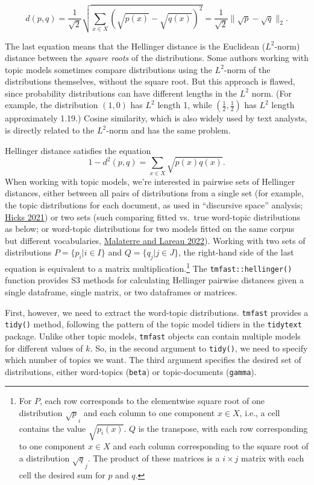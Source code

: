\documentclass[
]{article}
\begin{document}
\[ d(p,q) = \frac{1}{\sqrt{2}} \sqrt{\sum_{x \in X} (\sqrt{p(x)} - \sqrt{q(x)})^2} = \frac{1}{\sqrt{2}} \lVert \sqrt p - \sqrt q \rVert_2. \]

The last equation means that the Hellinger distance is the Euclidean
(\(L^2\)-norm) distance between the \emph{square roots} of the
distributions. Some authors working with topic models sometimes compare
distributions using the \(L^2\)-norm of the distributions themselves,
without the square root. But this approach is flawed, since probability
distributions can have different lengths in the \(L^2\) norm. (For
example, the distribution \((1, 0)\) has \(L^2\) length 1, while
\((\frac{1}{2}, \frac{1}{2} )\) has \(L^2\) length approximately 1.19.)
Cosine similarity, which is also widely used by text analysts, is
directly related to the \(L^2\)-norm and has the same problem.

Hellinger distance satisfies the equation
\[ 1 - d^2(p, q) = \sum_{x \in X} \sqrt{p(x)q(x)}. \] When working with
topic models, we're interested in pairwise sets of Hellinger distances,
either between all pairs of distributions from a single set (for
example, the topic distributions for each document, as used in
``discursive space'' analysis;
\protect\hyperlink{ref-HicksProductivityInterdisciplinaryImpacts2021}{Hicks
2021}) or two sets (such comparing fitted vs.~true word-topic
distributions as below; or word-topic distributions for two models
fitted on the same corpus but different vocabularies,
\protect\hyperlink{ref-MalaterreEarlyDaysContemporary2022}{Malaterre and
Lareau 2022}). Working with two sets of distributions
\(P = \{p_i | i \in I\}\) and \(Q = \{q_j | j \in J\}\), the right-hand
side of the last equation is equivalent to a matrix
multiplication.\footnote{For \(P\), each row corresponds to the
  elementwise square root of one distribution \(\sqrt p_i\) and each
  column to one component \(x \in X\), i.e., a cell contains the value
  \(\sqrt{p_i(x)}\). \(Q\) is the transpose, with each row corresponding
  to one component \(x \in X\) and each column corresponding to the
  square root of a distribution \(\sqrt q_j\). The product of these
  matrices is a \(i \times j\) matrix with each cell the desired sum for
  \(p\) and \(q\).} The \texttt{tmfast::hellinger()} function provides
S3 methods for calculating Hellinger pairwise distances given a single
dataframe, single matrix, or two dataframes or matrices.

First, however, we need to extract the word-topic distributions.
\texttt{tmfast} provides a \texttt{tidy()} method, following the pattern
of the topic model tidiers in the \texttt{tidytext} package. Unlike
other topic models, \texttt{tmfast} objects can contain multiple models
for different values of \(k\). So, in the second argument to
\texttt{tidy()}, we need to specify which number of topics we want. The
third argument specifies the desired set of distributions, either
word-topics (\texttt{\textquotesingle{}beta\textquotesingle{}}) or
topic-documents (\texttt{\textquotesingle{}gamma\textquotesingle{}}).
\end{document}
